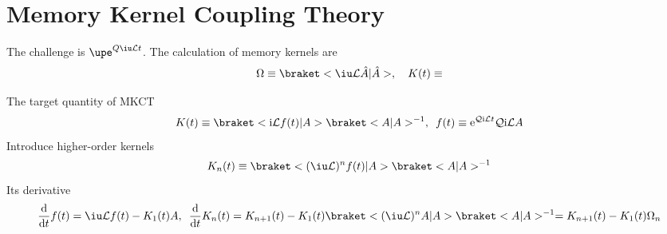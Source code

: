 \documentclass[preprint]{revtex4-2}
\begin{document}
\section{Memory Kernel Coupling Theory}

The challenge is $\upe^{Q\iu\mathcal Lt}$.
The calculation of memory kernels are
\[
  \Omega \equiv \braket<\iu\mathcal L\hat A|\hat A>, \quad
  K(t) \equiv
\]

The target quantity of MKCT
\begin{equation}
  K(t) \equiv \braket<\mathrm i \mathcal L f(t)|A> \braket<A|A>^{-1},\enspace
  f(t) \equiv \mathrm e^{\mathcal Q\mathrm i\mathcal Lt}
              \mathcal Q\mathrm i\mathcal LA
\end{equation}
Introduce higher-order kernels
\[
  K_n(t) \equiv \braket<(\iu\mathcal L)^n f(t)|A> \braket<A|A>^{-1}
\]
Its derivative
\[
  \odv*{f(t)}t = \iu\mathcal Lf(t) - K_1(t)A,\enspace
  \odv*{K_n(t)}t
= K_{n+1}(t) - K_1(t)\braket<(\iu\mathcal L)^nA|A>\braket<A|A>^{-1}
= K_{n+1}(t) - K_1(t)\Omega_n
\]
\end{document}
